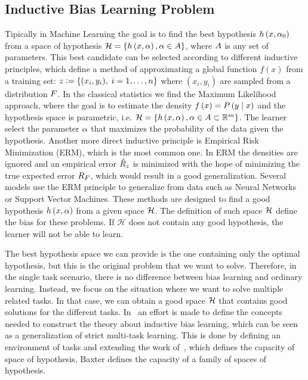 \subsection{Inductive Bias Learning Problem} %
Tipically in Machine Learning the goal is to find the best hypothesis $h\left(x, \alpha_0\right)$ from a space of hypothesis $\mathcal{H} = \left\{h\left(x, \alpha\right), \alpha \in A\right\}$, where $A$ is any set of parameters. This best candidate can be selected according to different inductive principles, which define a method of approximating a global function $f(x)$ from a training set:
$ z \vcentcolon= \left\{(x_i, y_i),\; i=1, \ldots, n\right\} $
where $(x_i, y_i)$ are sampled from a distribution $F$.
%
In the classical statistics we find the Maximum Likelihood approach, where the goal is to estimate the density $f\left(x\right) = P\left( y \;\middle\vert\; x \right)$ and the hypothesis space is parametric, i.e. $\mathcal{H} = \left\{h\left(x, \alpha\right), \alpha \in A \subset \mathbb{R}^m\right\}$. The learner select the parameter $\alpha$ that maximizes the probability of the data given the hypothesis.
%
Another more direct inductive principle is Empirical Risk Minimization (ERM), which is the most common one. In ERM the densities are ignored and an empirical error $\hat{R}_z$ is minimized with the hope of minimizing the true expected error $R_F$, which would result in a good generalization. 
%
Several models use the ERM principle to generalize from data such as Neural Networks or Support Vector Machines. These methods are designed to find a good hypothesis $h\left(x, \alpha\right)$ from a given space $\mathcal{H}$. The definition of such space $\mathcal{H}$ define the bias for these problems. If $\mathcal{H}$ does not contain any good hypothesis, the learner will not be able to learn.
%

The best hypothesis space we can provide is the one containing only the optimal hypothesis, but this is the original problem that we want to solve. Therefore, in the single task scenario, there is no difference between bias learning and ordinary learning.
Instead, we focus on the situation where we want to solve multiple related tasks. In that case, we can obtain a good space $\mathcal{H}$ that contains good solutions for the different tasks.
%
In~\cite{baxter2000model} an effort is made to define the concepts needed to construct the theory about inductive bias learning, which can be seen as a generalization of strict multi-task learning. This is done by defining an environment of tasks and extending the work of~\cite{vapnik2013nature}, which defines the capacity of space of hypothesis, Baxter defines the capacity of a family of spaces of hypothesis.

